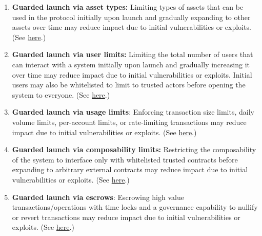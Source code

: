 \begin{enumerate}
\item\textbf{Guarded launch via asset types: }Limiting types of assets that can be used in the protocol initially upon launch and gradually expanding to other assets over time may reduce impact due to initial vulnerabilities or exploits. (See \href{https://medium.com/electric-capital/derisking-defi-guarded-launches-2600ce730e0a\#:~:text=Guarded%20Launches:%20Protecting%20Users%20with%20Limits\&text=A%20new%20contract%20is%20deployed,product%20in%20a%20limited%20scope.}{here}.)

\item\textbf{Guarded launch via user limits: }Limiting the total number of users that can interact with a system initially upon launch and gradually increasing it over time may reduce impact due to initial vulnerabilities or exploits. Initial users may also be whitelisted to limit to trusted actors before opening the system to everyone. (See \href{https://medium.com/electric-capital/derisking-defi-guarded-launches-2600ce730e0a\#:~:text=Guarded%20Launches:%20Protecting%20Users%20with%20Limits\&text=A%20new%20contract%20is%20deployed,product%20in%20a%20limited%20scope.}{here}.)

\item\textbf{Guarded launch via usage limits}: Enforcing transaction size limits, daily volume limits, per-account limits, or rate-limiting transactions may reduce impact due to initial vulnerabilities or exploits. (See \href{https://medium.com/electric-capital/derisking-defi-guarded-launches-2600ce730e0a\#:~:text=Guarded%20Launches:%20Protecting%20Users%20with%20Limits\&text=A%20new%20contract%20is%20deployed,product%20in%20a%20limited%20scope.}{here}.)

\item\textbf{Guarded launch via composability limits: }Restricting the composability of the system to interface only with whitelisted trusted contracts before expanding to arbitrary external contracts may reduce impact due to initial vulnerabilities or exploits. (See \href{https://medium.com/electric-capital/derisking-defi-guarded-launches-2600ce730e0a\#:~:text=Guarded%20Launches:%20Protecting%20Users%20with%20Limits\&text=A%20new%20contract%20is%20deployed,product%20in%20a%20limited%20scope.}{here}.)

\item\textbf{Guarded launch via escrows}: Escrowing high value transactions/operations with time locks and a governance capability to nullify or revert transactions may reduce impact due to initial vulnerabilities or exploits. (See \href{https://medium.com/electric-capital/derisking-defi-guarded-launches-2600ce730e0a\#:~:text=Guarded%20Launches:%20Protecting%20Users%20with%20Limits\&text=A%20new%20contract%20is%20deployed,product%20in%20a%20limited%20scope.}{here}.)


\end{enumerate}
